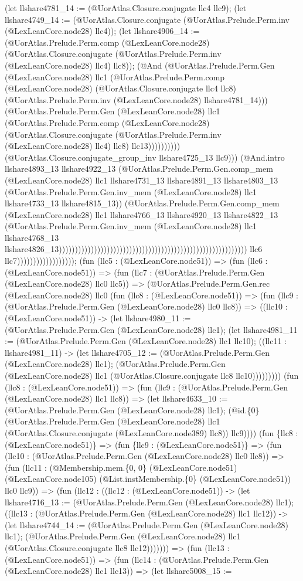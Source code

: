\documentclass[11pt]{article}
\begin{document}
(let llshare4781\_14 := (@UorAtlas.Closure.conjugate llc4 llc9); (let llshare4749\_14 := (@UorAtlas.Closure.conjugate (@UorAtlas.Prelude.Perm.inv (@LexLeanCore.node28) llc4)); (let llshare4906\_14 := (@UorAtlas.Prelude.Perm.comp (@LexLeanCore.node28) (@UorAtlas.Closure.conjugate (@UorAtlas.Prelude.Perm.inv (@LexLeanCore.node28) llc4) llc8)); (@And (@UorAtlas.Prelude.Perm.Gen (@LexLeanCore.node28) llc1 (@UorAtlas.Prelude.Perm.comp (@LexLeanCore.node28) (@UorAtlas.Closure.conjugate llc4 llc8) (@UorAtlas.Prelude.Perm.inv (@LexLeanCore.node28) llshare4781\_14))) (@UorAtlas.Prelude.Perm.Gen (@LexLeanCore.node28) llc1 (@UorAtlas.Prelude.Perm.comp (@LexLeanCore.node28) (@UorAtlas.Closure.conjugate (@UorAtlas.Prelude.Perm.inv (@LexLeanCore.node28) llc4) llc8) llc13)))))))))) (@UorAtlas.Closure.conjugate\_group\_inv llshare4725\_13 llc9))) (@And.intro llshare4893\_13 llshare4922\_13 (@UorAtlas.Prelude.Perm.Gen.comp\_mem (@LexLeanCore.node28) llc1 llshare4731\_13 llshare4891\_13 llshare4803\_13 (@UorAtlas.Prelude.Perm.Gen.inv\_mem (@LexLeanCore.node28) llc1 llshare4733\_13 llshare4815\_13)) (@UorAtlas.Prelude.Perm.Gen.comp\_mem (@LexLeanCore.node28) llc1 llshare4766\_13 llshare4920\_13 llshare4822\_13 (@UorAtlas.Prelude.Perm.Gen.inv\_mem (@LexLeanCore.node28) llc1 llshare4768\_13 llshare4826\_13))))))))))))))))))))))))))))))))))))))))))))))))))))))))))) llc6 llc7)))))))))))))))))); (fun (llc5 : (@LexLeanCore.node51)) => (fun (llc6 : (@LexLeanCore.node51)) => (fun (llc7 : (@UorAtlas.Prelude.Perm.Gen (@LexLeanCore.node28) llc0 llc5)) => (@UorAtlas.Prelude.Perm.Gen.rec (@LexLeanCore.node28) llc0 (fun (llc8 : (@LexLeanCore.node51)) => (fun (llc9 : (@UorAtlas.Prelude.Perm.Gen (@LexLeanCore.node28) llc0 llc8)) => ((llc10 : (@LexLeanCore.node51)) -> (let llshare4980\_11 := (@UorAtlas.Prelude.Perm.Gen (@LexLeanCore.node28) llc1); (let llshare4981\_11 := (@UorAtlas.Prelude.Perm.Gen (@LexLeanCore.node28) llc1 llc10); ((llc11 : llshare4981\_11) -> (let llshare4705\_12 := (@UorAtlas.Prelude.Perm.Gen (@LexLeanCore.node28) llc1); (@UorAtlas.Prelude.Perm.Gen (@LexLeanCore.node28) llc1 (@UorAtlas.Closure.conjugate llc8 llc10))))))))) (fun (llc8 : (@LexLeanCore.node51)) => (fun (llc9 : (@UorAtlas.Prelude.Perm.Gen (@LexLeanCore.node28) llc1 llc8)) => (let llshare4633\_10 := (@UorAtlas.Prelude.Perm.Gen (@LexLeanCore.node28) llc1); (@id.\{0\} (@UorAtlas.Prelude.Perm.Gen (@LexLeanCore.node28) llc1 (@UorAtlas.Closure.conjugate (@LexLeanCore.node389) llc8)) llc9)))) (fun \{llc8 : (@LexLeanCore.node51)\} => (fun \{llc9 : (@LexLeanCore.node51)\} => (fun (llc10 : (@UorAtlas.Prelude.Perm.Gen (@LexLeanCore.node28) llc0 llc8)) => (fun (llc11 : (@Membership.mem.\{0, 0\} (@LexLeanCore.node51) (@LexLeanCore.node105) (@List.instMembership.\{0\} (@LexLeanCore.node51)) llc0 llc9)) => (fun (llc12 : ((llc12 : (@LexLeanCore.node51)) -> (let llshare4716\_13 := (@UorAtlas.Prelude.Perm.Gen (@LexLeanCore.node28) llc1); ((llc13 : (@UorAtlas.Prelude.Perm.Gen (@LexLeanCore.node28) llc1 llc12)) -> (let llshare4744\_14 := (@UorAtlas.Prelude.Perm.Gen (@LexLeanCore.node28) llc1); (@UorAtlas.Prelude.Perm.Gen (@LexLeanCore.node28) llc1 (@UorAtlas.Closure.conjugate llc8 llc12))))))) => (fun (llc13 : (@LexLeanCore.node51)) => (fun (llc14 : (@UorAtlas.Prelude.Perm.Gen (@LexLeanCore.node28) llc1 llc13)) => (let llshare5008\_15 := 
\end{document}
